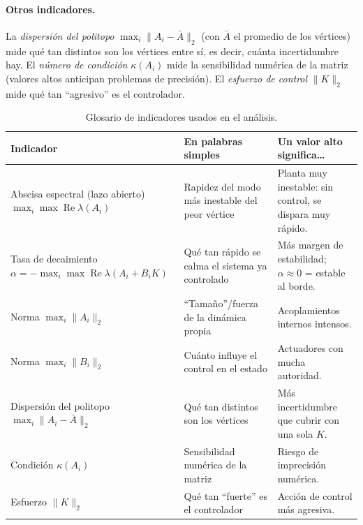 \paragraph{Otros indicadores.}
La \emph{dispersión del politopo} $\max_i\lVert A_i-\bar A\rVert_2$ (con $\bar A$
el promedio de los vértices) mide qué tan distintos son los vértices entre sí,
es decir, cuánta incertidumbre hay. El \emph{número de condición} $\kappa(A_i)$
mide la sensibilidad numérica de la matriz (valores altos anticipan problemas de
precisión). El \emph{esfuerzo de control} $\lVert K\rVert_2$ mide qué tan
``agresivo'' es el controlador.

\begin{table}[t]
  \centering
  \caption{Glosario de indicadores usados en el análisis.}
  \label{tab:glosario}
  \small
  \begin{tabular}{p{3.0cm}p{3.4cm}p{6.6cm}}
    \toprule
    Indicador & En palabras simples & Un valor alto significa\dots \\
    \midrule
    Abscisa espectral (lazo abierto)\newline $\max_i\max\operatorname{Re}\lambda(A_i)$
      & Rapidez del modo más inestable del peor vértice
      & Planta muy inestable: sin control, se dispara muy rápido. \\
    Tasa de decaimiento\newline $\alpha=-\max_i\max\operatorname{Re}\lambda(A_i+B_iK)$
      & Qué tan rápido se calma el sistema ya controlado
      & Más margen de estabilidad; $\alpha\approx0$ = estable al borde. \\
    Norma $\max_i\lVert A_i\rVert_2$
      & ``Tamaño''/fuerza de la dinámica propia
      & Acoplamientos internos intensos. \\
    Norma $\max_i\lVert B_i\rVert_2$
      & Cuánto influye el control en el estado
      & Actuadores con mucha autoridad. \\
    Dispersión del politopo\newline $\max_i\lVert A_i-\bar A\rVert_2$
      & Qué tan distintos son los vértices
      & Más incertidumbre que cubrir con una sola $K$. \\
    Condición $\kappa(A_i)$
      & Sensibilidad numérica de la matriz
      & Riesgo de imprecisión numérica. \\
    Esfuerzo $\lVert K\rVert_2$
      & Qué tan ``fuerte'' es el controlador
      & Acción de control más agresiva. \\
    \bottomrule
  \end{tabular}
\end{table}





